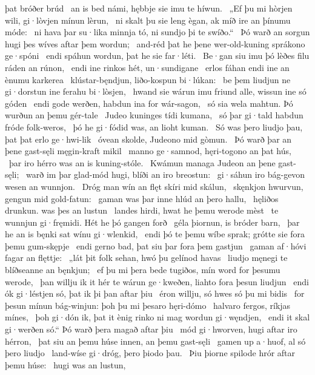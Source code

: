 þat bróðer brúd \hld\ an is bed námi,
hębbje sie imu te híwun. \hld\ „Ef þu mi hòrjen wili,
gi·lòvjen mínun lèrun, \hld\ ni skalt þu sie leng ègan,
ak míð ire an þínumu móde: \hld\ ni hava þar su·lika minnja tó,
ni sundjo þi te swíðo.“ \hld\ Þó warð an sorgun hugi
þes wíves aftar þem wordun; \hld\ and-réd þat he þene wer-old-kuning
sprákono ge·spóni \hld\ endi spáhun wordun,
þat he sie far·léti. \hld\ Be·gan siu imu þó lèðes filu
ráden an rúnon, \hld\ endi ine rinkos hét,
un·sundigane \hld\ erlos fáhan
endi ine an ènumu karkerea \hld\ klústar-bęndjun,
liðo-kospun bi·lúkan: \hld\ be þem liudjun ne gi·dorstun
ine ferahu bi·lòsjen, \hld\ hwand sie wárun imu friund alle,
wissun ine só góden \hld\ endi gode werðen,
habdun ina for wár-sagon, \hld\ só sia wela mahtun.
Þó wurðun an þemu gér-tale \hld\ Judeo kuninges
tídi kumana, \hld\ só þar gi·tald habdun
fróde folk-weros, \hld\ þó he gi·fódid was,
an lioht kuman. \hld\ Só was þero liudjo þau,
þat þat erlo ge·hwi-lik \hld\ óvean skolde,
Judeono mid gòmun. \hld\ Þó warð þar an þene gast-sęli
męgin-kraft mikil \hld\ manno ge·samnod,
hęri-togono an þat hús, \hld\ þar iro hérro was
an is kuning-stóle. \hld\ Kwámun managa
Judeon an þene gast-sęli; \hld\ warð im þar glad-mód hugi,
blíði an iro breostun: \hld\ gi·sáhun iro bág-gevon
wesen an wunnjon. \hld\ Dróg man wín an flęt
skíri mid skálun, \hld\ skęnkjon hwurvun,
gengun mid gold-fatun: \hld\ gaman was þar inne
hlúd an þero hallu, \hld\ hęliðos drunkun.
was þes an lustun \hld\ landes hirdi,
hwat he þemu werode mèst \hld\ te wunnjun gi·fręmidi.
Hét he þó gangen forð \hld\ géla þiornun,
is bróder barn, \hld\ þar he an is bęnki sat
wínu gi·wlenkid, \hld\ endi þó te þemu wíbe sprak;
grótte sie fora þemu gum-skępje \hld\ endi gerno bad,
þat siu þar fora þem gastjun \hld\ gaman af·hóvi
fagar an flęttje: \hld\ „lát þit folk sehan,
hwó þu gelínod havas \hld\ liudjo męnegi
te blíðseanne an bęnkjun; \hld\ ef þu mi þera bede tugiðos,
mín word for þesumu werode, \hld\ þan willju ik it hér te wárun ge·kweðen,
liahto fora þesun liudjun \hld\ endi ók gi·léstjen só,
þat ik þi þan aftar þiu \hld\ éron willju,
só hwes só þu mi bidis \hld\ for þesun mínun bág-winjun:
þoh þu mi þesaro hęri-dómo \hld\ halvaro fergos,
ríkjas mínes, \hld\ þoh gi·dón ik, þat it ènig rinko ni mag
wordun gi·węndjen, \hld\ endi it skal gi·werðen só.“
Þó warð þera magað aftar þiu \hld\ mód gi·hworven,
hugi aftar iro hérron, \hld\ þat siu an þemu húse innen,
an þemu gast-sęli \hld\ gamen up a·huof,
al só þero liudjo \hld\ land-wíse gi·dróg,
þero þiodo þau. \hld\ Þiu þiorne spilode
hrór aftar þemu húse: \hld\ hugi was an lustun,
